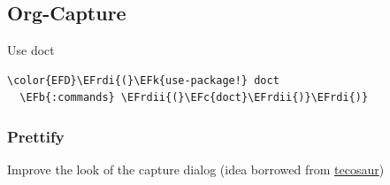 \documentclass{scrartcl}
\newcommand{\EFk}[1]{\textcolor{EFk}{#1}} %
\newcommand{\EFb}[1]{\textcolor{EFb}{#1}} %
\newcommand{\EFc}[1]{\textcolor{EFc}{#1}} %
\newcommand{\EFrdi}[1]{\textcolor{EFrdi}{#1}} %
\newcommand{\EFrdii}[1]{\textcolor{EFrdii}{#1}} %
\begin{document}
\subsection{Org-Capture}
\label{sec:org385b051}
Use doct
\begin{Code}
\begin{Verbatim}[]
\color{EFD}\EFrdi{(}\EFk{use-package!} doct
  \EFb{:commands} \EFrdii{(}\EFc{doct}\EFrdii{)}\EFrdi{)}
\end{Verbatim}
\end{Code}

\subsubsection{Prettify}
\label{sec:org4cbaf0e}
Improve the look of the capture dialog (idea borrowed from \href{https://github.com/tecosaur}{tecosaur})
\end{document}
